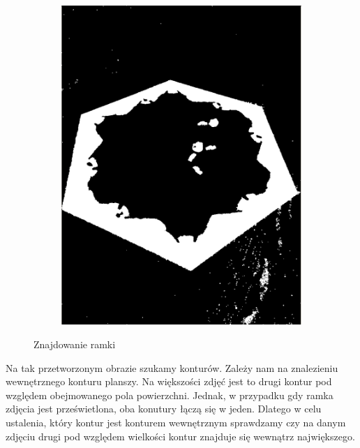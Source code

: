 \documentclass[a4paper]{article}
\begin{document}
\begin{figure}[H]
\begin{subfigure}[t]{.3\linewidth}
        \includegraphics[width=\linewidth]{pictures/steps/find_water_dilate.png}
        \end{subfigure}

        \caption{Znajdowanie ramki}
        \label{fig:step1}
    \end{figure}

    Na tak przetworzonym obrazie szukamy konturów. Zależy nam na znalezieniu wewnętrznego konturu planszy. Na większości zdjęć jest to drugi kontur pod względem obejmowanego pola powierzchni. Jednak, w przypadku gdy ramka zdjęcia jest prześwietlona, oba konutury łączą się w jeden. Dlatego w celu ustalenia, który kontur jest konturem wewnętrznym sprawdzamy czy na danym zdjęciu drugi pod względem wielkości kontur znajduje się wewnątrz największego.
\end{document}
